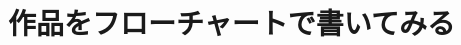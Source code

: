 \documentclass[10pt, dvipdfmx]{beamer}
\begin{document}
    \section{作品をフローチャートで書いてみる}
        \begin{frame}
        \end{frame}

        \begin{frame}
        \end{frame}
\end{document}
